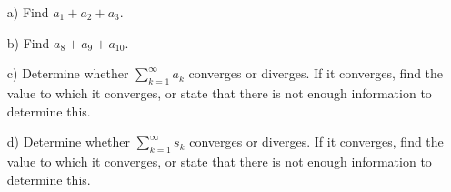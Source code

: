 \documentclass[12pt]{article}
\begin{document}
\begin{itemize}
\item[a)] Find $a_1+a_2+a_3$.
\item[b)] Find $a_8+a_9+a_{10}$.
\item[c)] Determine whether $\displaystyle \sum_{k=1}^{\infty} a_k$ converges or diverges.  If it converges, find the value to which it converges, or state that there is not enough information to determine this.
\item[d)] Determine whether $\displaystyle \sum_{k=1}^{\infty} s_k$ converges or diverges.  If it converges, find the value to which it converges, or state that there is not enough information to determine this.

\end{itemize}

%
%
%
%
%
%
%
%
%
%
%
%
%
\end{document}
